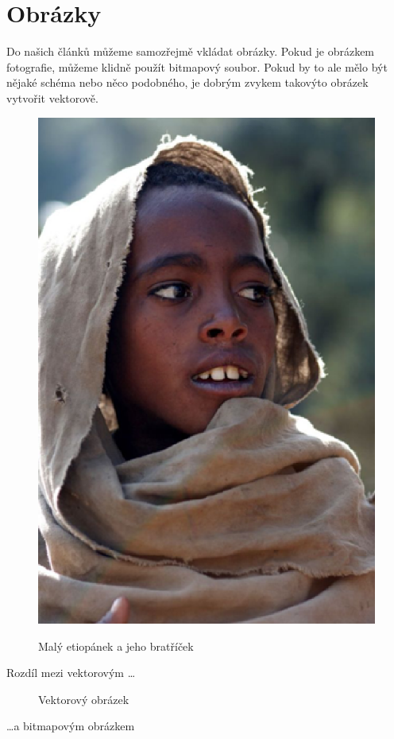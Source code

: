 \documentclass[a4paper,11pt]{article}
\begin{document}
\section{Obrázky}
Do našich článků můžeme samozřejmě vkládat obrázky. Pokud je obrázkem fotografie, můžeme klidně použít bitmapový soubor. Pokud by to ale mělo být nějaké schéma nebo něco podobného, je dobrým zvykem takovýto obrázek vytvořit vektorově. 
\begin{figure}[h]
\center
{\scalebox{0.45}
    {\includegraphics{etiopan.eps} }
}
\label{import_picture}
\caption{Malý etiopánek a jeho bratříček}
\end{figure}
\newpage
Rozdíl mezi vektorovým \dots
\begin{figure}[h]
\caption{Vektorový obrázek}
\label{vector_picture}
\end{figure}
\bigskip

\dots a bitmapovým obrázkem
\begin{figure}[h]
\center
\end{figure}
\end{document}
